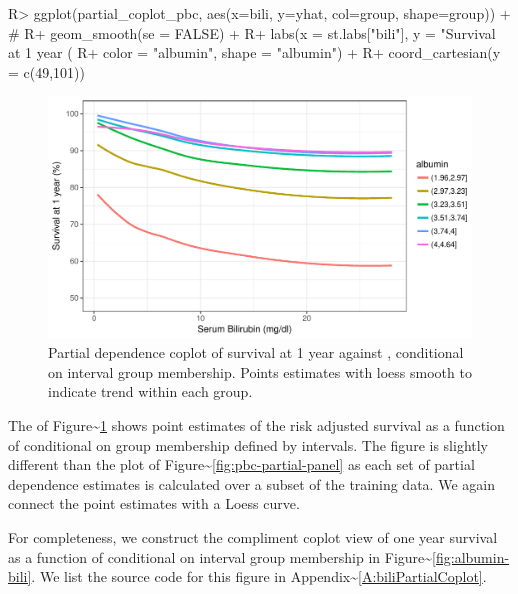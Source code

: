 \documentclass[article]{jss}
\begin{document}
\begin{Schunk}
\begin{Sinput}
R> ggplot(partial_coplot_pbc, aes(x=bili, y=yhat, col=group, shape=group)) + #
R+   geom_smooth(se = FALSE) +
R+   labs(x = st.labs["bili"], y = "Survival at 1 year (%
R+        color = "albumin", shape = "albumin") +
R+   coord_cartesian(y = c(49,101))
\end{Sinput}
\begin{figure}[!htb]

{\centering \includegraphics{fig-rfs/rfs-bili-albumin-1} 

}

\caption[Partial dependence coplot of survival at 1 year against , conditional on  interval group membership]{Partial dependence coplot of survival at 1 year against , conditional on  interval group membership. Points estimates with loess smooth to indicate trend within each group.}\label{fig:bili-albumin}
\end{figure}
\end{Schunk}

The  of
Figure\textasciitilde{}\ref{fig:bili-albumin} shows point estimates of
the risk adjusted survival as a function of  conditional on
group membership defined by  intervals. The figure is
slightly different than the  plot of
Figure\textasciitilde{}\ref{fig:pbc-partial-panel} as each set of
partial dependence estimates is calculated over a subset of the training
data. We again connect the point estimates with a Loess curve.

For completeness, we construct the compliment coplot view of one year
survival as a function of  conditional on 
interval group membership in
Figure\textasciitilde{}\ref{fig:albumin-bili}. We list the source code
for this figure in Appendix\textasciitilde{}\ref{A:biliPartialCoplot}.
\end{document}
